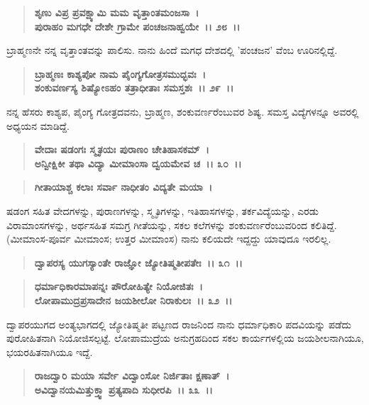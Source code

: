 \begin{verse}
\textbf{ಶೃಣು ವಿಪ್ರ ಪ್ರವಕ್ಷ್ಯಾಮಿ ಮಮ ವೃತ್ತಾಂತಮಂಜಸಾ~।}\\\textbf{ಪುರಾಹಂ ಮಗಧೇ ದೇಶೇ ಗ್ರಾಮೇ ಪಂಚಜನಾಹ್ವಯೇ~।। ೨೮~।।}
\end{verse}

ಬ್ರಾಹ್ಮಣನೇ ನನ್ನ ವೃತ್ತಾಂತವನ್ನು ಪಾಲಿಸು. ನಾನು ಹಿಂದೆ ಮಗಧ ದೇಶದಲ್ಲಿ 'ಪಂಚಜನ' ವೆಂಬ ಊರಿನಲ್ಲಿದ್ದೆ.

\begin{verse}
\textbf{ಬ್ರಾಹ್ಮಣಃ ಕಾಶ್ಯಪೋ ನಾಮ ಪೈಂಗ್ಯಗೋತ್ರಸಮುದ್ಭವಃ~।}\\\textbf{ಶಂಕುವರ್ಣಸ್ಯ ಶಿಷ್ಯೋಽಹಂ ತತ್ರಾಧೀತಾಃ ಸಮಸ್ತಶಃ~।। ೨೯~।।}
\end{verse}

ನನ್ನ ಹೆಸರು ಕಾಶ್ಯಪ, ಪೈಂಗ್ಯ ಗೋತ್ರದವನು, ಬ್ರಾಹ್ಮಣ, ಶಂಕುವರ್ಣರೆಂಬುವರ ಶಿಷ್ಯ. ಸಮಸ್ತ ವಿದ್ಯೆಗಳನ್ನೂ ಅವರಲ್ಲಿ ಅಧ್ಯಯನ ಮಾಡಿದ್ದೆ.

\begin{verse}
\textbf{ವೇದಾಃ ಷಡಂಗಃ ಸ್ಮೃತಯಃ ಪುರಾಣಂ ಚೇತಿಹಾಸಕಮ್~।}\\\textbf{ಅನ್ವೀಕ್ಷಿಕೀ ತಥಾ ವಿದ್ಯಾ ಮೀಮಾಂಸಾ ದ್ವಯಮೇವ ಚ~।। ೩೦~।।}
\end{verse}

\begin{verse}
\textbf{ಗೀತಾಯಾಶ್ಚ ಕಲಾಃ ಸರ್ವಾ ನಾಧೀತಂ ವಿದ್ಯತೇ ಮಯಾ~।}
\end{verse}

ಷಡಂಗ ಸಹಿತ ವೇದಗಳನ್ನು, ಪುರಾಣಗಳನ್ನು, ಸ್ಮೃತಿಗಳನ್ನು, ಇತಿಹಾಸಗಳನ್ನು, ತರ್ಕವಿದ್ಯೆಯನ್ನು, ಎರಡು ವಿರಾಮಾಂಸಗಳನ್ನು, ಅರ್ಥಸಹಿತ ಸಮಗ್ರ ಗೀತೆಯನ್ನು, ಸಕಲ ಕಲೆಗಳನ್ನು ಶಂಕುವರ್ಣರೆಂಬುವರಿಂದ ಕಲಿತಿದ್ದೆ. (ಮೀಮಾಂಸ-ಪೂರ್ವ ಮೀಮಾಂಸ; ಉತ್ತರ ಮೀಮಾಂಸ) ನಾನು ಕಲಿಯದೇ ಇದ್ದದ್ದು ಯಾವುದೂ ಇರಲಿಲ್ಲ.

\begin{verse}
\textbf{ದ್ವಾಪರಸ್ಯ ಯುಗಸ್ಯಾಂತೇ ರಾಜ್ಞೋ ಜ್ಯೋತಿಷ್ಮತೀಪತೇಃ~।। ೩೧~।।}
\end{verse}

\begin{verse}
\textbf{ಧರ್ಮಾಧಿಕಾರಮಾಪನ್ನಃ ಪೌರೋಹಿತ್ಯೇ ನಿಯೋಜಿತಃ~।}\\\textbf{ಲೋಪಾಮುದ್ರಪ್ರಸಾದೇನ ಜಯಶೀಲೋ ನಿರಾಕುಲಃ~।। ೩೨~।।}
\end{verse}

ದ್ವಾಪರಯುಗದ ಅಂತ್ಯಭಾಗದಲ್ಲಿ ಜ್ಯೋತಿಷ್ಮತೀ ಪಟ್ಟಣದ ರಾಜನಿಂದ ನಾನು ಧರ್ಮಾಧಿ\-ಕಾರಿ ಪದವಿಯನ್ನು ಪಡೆದು ಪುರೋಹಿತನಾಗಿ ನಿಯೋಜಿಸಲ್ಪಟ್ಟೆ. ಲೋಪಾಮುದ್ರೆಯ ಅನುಗ್ರಹದಿಂದ ಸಕಲ ಕಾರ್ಯಗಳಲ್ಲಿಯ ಜಯಶೀಲನಾಗಿಯೂ, ಭಯರಹಿತನಾಗಿಯೂ ಇದ್ದೆ.

\begin{verse}
\textbf{ರಾಜದ್ವಾರಿ ಮಯಾ ಸರ್ವೇ ವಿದ್ವಾಂಸೋ ನಿರ್ಜಿತಾಃ ಕ್ಷಣಾತ್~।}\\\textbf{ಅವಿದ್ವಾನಯಮಿತ್ತುಕ್ತ್ವಾ ಪ್ರತ್ಯಪಾದಿ ಸುಧೀರಪಿ~।। ೩೩~।। }
\end{verse}

